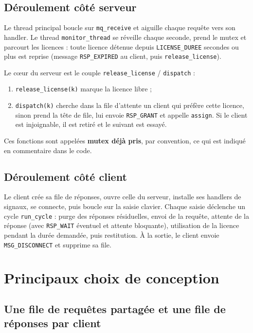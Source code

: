 \documentclass[11pt,a4paper]{article}
\newcommand{\code}[1]{\texttt{#1}}
\begin{document}
\subsection{Déroulement côté serveur}

Le thread principal boucle sur \code{mq\_receive} et aiguille chaque requête vers son handler. Le thread \code{monitor\_thread} se réveille chaque seconde, prend le mutex et parcourt les licences : toute licence détenue depuis \code{LICENSE\_DUREE} secondes ou plus est reprise (message \code{RSP\_EXPIRED} au client, puis \code{release\_license}).

Le c\oe ur du serveur est le couple \code{release\_license} / \code{dispatch} :
\begin{enumerate}
  \item \code{release\_license(k)} marque la licence libre ;
  \item \code{dispatch(k)} cherche dans la file d'attente un client qui préfère cette licence, sinon prend la tête de file, lui envoie \code{RSP\_GRANT} et appelle \code{assign}. Si le client est injoignable, il est retiré et le suivant est essayé.
\end{enumerate}

Ces fonctions sont appelées \textbf{mutex déjà pris}, par convention, ce qui est indiqué en commentaire dans le code.

\subsection{Déroulement côté client}

Le client crée sa file de réponses, ouvre celle du serveur, installe ses handlers de signaux, se connecte, puis boucle sur la saisie clavier. Chaque saisie déclenche un cycle \code{run\_cycle} : purge des réponses résiduelles, envoi de la requête, attente de la réponse (avec \code{RSP\_WAIT} éventuel et attente bloquante), utilisation de la licence pendant la durée demandée, puis restitution. À la sortie, le client envoie \code{MSG\_DISCONNECT} et supprime sa file.

\section{Principaux choix de conception}

\subsection{Une file de requêtes partagée et une file de réponses par client}
\end{document}
